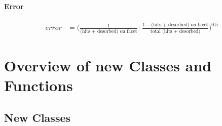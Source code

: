 
\subsubsection*{Error}
\begin{equation}
	\label{eq:error}
	\begin{split}
		error&=\Big( \frac{1}{\text{(hits + desorbed) on facet}} \cdot \frac{1-\text{(hits + desorbed) on facet}}{\text{total (hits + desorbed)}} \Big)^{0.5}
	\end{split}
\end{equation}

\chapter{Overview of new Classes and Functions}
\section{New Classes}

